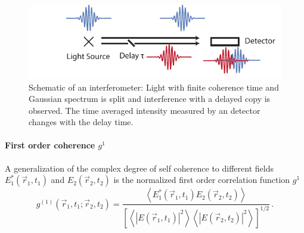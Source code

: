  \begin{figure}
	\centering
	\includegraphics[width=0.8\linewidth]{images/michelson.pdf}
	\caption[Schematic of an interferometer]{Schematic of an interferometer: Light with finite coherence time and Gaussian spectrum is split and interference with a delayed copy is observed. The time averaged intensity measured by an detector changes with the delay time. }
	\label{fig:michelson}
\end{figure}

\paragraph{First order coherence $g^1$}
A generalization of the complex degree of self coherence to different fields  $E_1^*(\vec{r}_1,t_1)$ and $E_2(\vec{r}_2,t_2)$ is the normalized first order correlation function $g^1$ \cite{agarwal2013}
\begin{equation}
	g^{(1)}(\vec{r}_1,t_1;\vec{r}_2,t_2)= \frac
	{\left< E_1^*(\vec{r}_1,t_1)E_2(\vec{r}_2,t_2) \right>}
	{\left[ \left<\left | E(\vec{r}_1,t_1)\right |^2 \right> \left< \left |E(\vec{r}_2,t_2)\right |^2 \right>\right]^{1/2}}	\,.
\end{equation}

